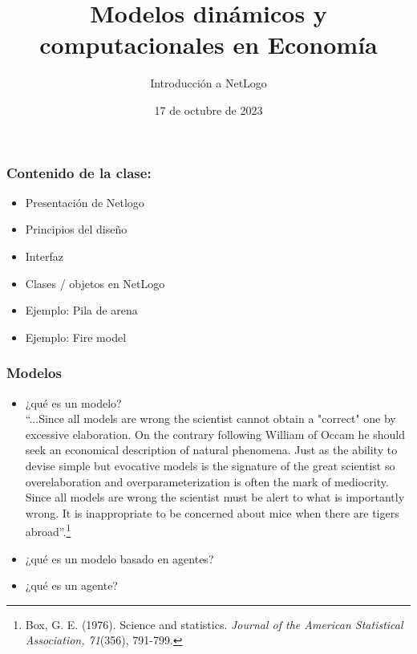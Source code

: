 \documentclass[11pt]{beamer}
\begin{document}
	\title{Modelos dinámicos y computacionales en Economía}
	\subtitle{Introducción a NetLogo}
	\date{17 de octubre de 2023}

	

\begin{frame}
\frametitle{Contenido de la clase:}
\begin{itemize}
	\item Presentación de Netlogo
	\item Principios del diseño
	\item Interfaz
	\item Clases / objetos en NetLogo
	\item Ejemplo: Pila de arena
	\item Ejemplo: Fire model	
\end{itemize}
\end{frame}

\begin{frame}
	\frametitle{Modelos}
\begin{itemize}
\item ¿qué es un modelo?\\
``...Since all models are wrong the scientist cannot obtain a "correct" one by excessive elaboration. On the contrary following William of Occam he should seek an economical description of natural phenomena. Just as the ability to devise simple but evocative models is the signature of the great scientist so overelaboration and overparameterization is often the mark of mediocrity.
\\Since all models are wrong the scientist must be alert to what is  importantly wrong. It is inappropriate to be concerned about mice when there are tigers abroad''.\footnote{Box, G. E. (1976). Science and statistics. \textit{Journal of the American Statistical Association, 71}(356), 791-799.}

\item ¿qué es un modelo basado en agentes?
\item ¿qué es un agente?
\end{itemize}

\end{frame}
\end{document}
